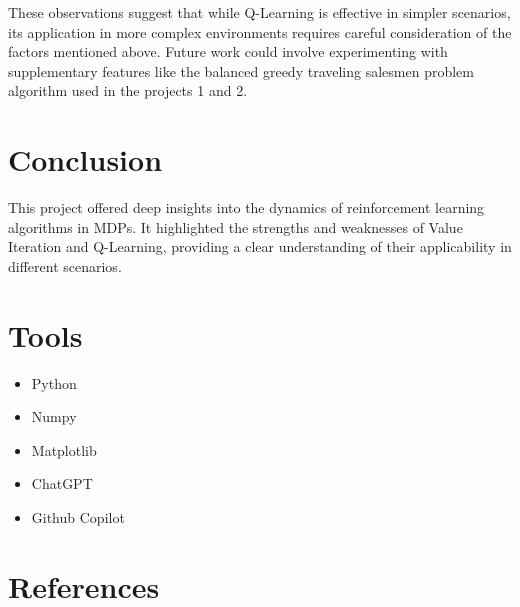 \documentclass{article}
\begin{document}
These observations suggest that while Q-Learning is effective in simpler 
scenarios, its application in more complex environments requires careful consideration
 of the factors mentioned above. Future work could involve experimenting with supplementary features like the balanced greedy traveling salesmen problem algorithm used in the projects 1 and 2.

\section{Conclusion}
This project offered deep insights into the dynamics of reinforcement learning algorithms in MDPs. 
It highlighted the strengths and weaknesses of Value Iteration and Q-Learning, 
providing a clear understanding of their applicability in different scenarios.

\section{Tools}
\begin{itemize}
    \item Python
    \item Numpy
    \item Matplotlib
    \item ChatGPT
    \item Github Copilot
\end{itemize}
\section{References}


\end{document}
